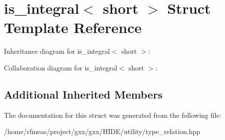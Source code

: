 \hypertarget{structis__integral_3_01short_01_4}{}\section{is\+\_\+integral$<$ short $>$ Struct Template Reference}
\label{structis__integral_3_01short_01_4}


Inheritance diagram for is\+\_\+integral$<$ short $>$\+:


Collaboration diagram for is\+\_\+integral$<$ short $>$\+:
\subsection*{Additional Inherited Members}


The documentation for this struct was generated from the following file\+:\begin{DoxyCompactItemize}
\item 
/home/rfmeas/project/gxx/gxx/\+H\+I\+D\+E/utility/type\+\_\+relation.\+hpp\end{DoxyCompactItemize}
